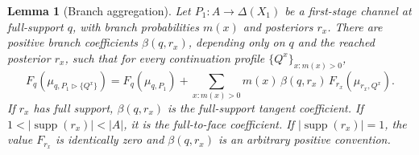\documentclass[11pt,a4paper]{article}
\newtheorem{lemma}[theorem]{Lemma}
\theoremstyle{definition}
\newcommand{\1}{\mathbf 1}
\begin{document}
\begin{lemma}[Branch aggregation]\label{pt:lem:branchagg}
Let $P_1:A\to\Delta(X_1)$ be a first-stage channel at full-support $q$, with branch probabilities $m(x)$ and posteriors
$r_x$.  There are positive branch coefficients $\beta(q,r_x)$, depending only on $q$ and the reached posterior $r_x$,
such that for every continuation profile $\{Q^x\}_{x:m(x)>0}$,
\[
F_q(\mu_{q,P_1\triangleright\{Q^x\}})
=
F_q(\mu_{q,P_1})+
\sum_{x:m(x)>0}m(x)\,\beta(q,r_x)\,
F_{r_x}(\mu_{r_x,Q^x}).
\]
If $r_x$ has full support, $\beta(q,r_x)$ is the full-support tangent coefficient.  If
$1<|\operatorname{supp}(r_x)|<|A|$, it is the full-to-face coefficient.  If $|\operatorname{supp}(r_x)|=1$, the value
$F_{r_x}$ is identically zero and $\beta(q,r_x)$ is an arbitrary positive convention.
\end{lemma}
\end{document}
